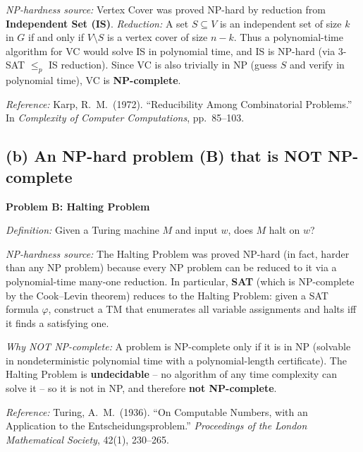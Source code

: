 \documentclass[12pt]{article}
\begin{document}
\textit{NP-hardness source:}  Vertex Cover was proved NP-hard by reduction
from \textbf{Independent Set (IS)}.
\textit{Reduction:}  A set $S\subseteq V$ is an independent set of size $k$
in $G$ if and only if $V\setminus S$ is a vertex cover of size $n-k$.  Thus
a polynomial-time algorithm for VC would solve IS in polynomial time, and IS
is NP-hard (via 3-SAT $\le_p$ IS reduction).  Since VC is also trivially in
NP (guess $S$ and verify in polynomial time), VC is \textbf{NP-complete}.

\textit{Reference:}  Karp, R.\ M.\ (1972).
``Reducibility Among Combinatorial Problems.''
In \textit{Complexity of Computer Computations}, pp.\ 85--103.

\subsection*{(b) An NP-hard problem (B) that is NOT NP-complete}

\textbf{Problem B: Halting Problem}

\textit{Definition:}  Given a Turing machine $M$ and input $w$, does $M$
halt on $w$?

\textit{NP-hardness source:}  The Halting Problem was proved NP-hard (in fact,
harder than any NP problem) because every NP problem can be reduced to it via
a polynomial-time many-one reduction.  In particular, \textbf{SAT} (which is
NP-complete by the Cook--Levin theorem) reduces to the Halting Problem: given
a SAT formula $\varphi$, construct a TM that enumerates all variable assignments
and halts iff it finds a satisfying one.

\textit{Why NOT NP-complete:}  A problem is NP-complete only if it is in NP
(solvable in nondeterministic polynomial time with a polynomial-length
certificate).  The Halting Problem is \textbf{undecidable} -- no algorithm of
any time complexity can solve it -- so it is not in NP, and therefore
\textbf{not NP-complete}.

\textit{Reference:}  Turing, A.\ M.\ (1936).
``On Computable Numbers, with an Application to the Entscheidungsproblem.''
\textit{Proceedings of the London Mathematical Society}, 42(1), 230--265.
\end{document}
